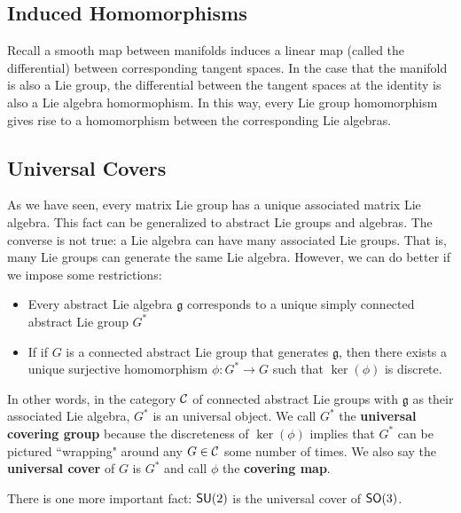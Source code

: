 \subsection{Induced Homomorphisms}
Recall a smooth map between manifolds induces a linear map (called the differential) between corresponding tangent spaces. In the case that the manifold is also a Lie group, the differential between the tangent spaces at the identity is also a Lie algebra homormophism. In this way, every Lie group homomorphism gives rise to a homomorphism between the corresponding Lie algebras.

\subsection{Universal Covers}
As we have seen, every matrix Lie group has a unique associated matrix Lie algebra. This fact can be generalized to abstract Lie groups and algebras. The converse is not true: a Lie algebra can have many associated Lie groups. That is, many Lie groups can generate the same Lie algebra. However, we can do better if we impose some restrictions:
\begin{itemize}
    \item Every abstract Lie algebra $\mathfrak g$ corresponds to a unique simply connected abstract Lie group $G^*$
    \item If if $G$ is a connected abstract Lie group that generates $\mathfrak g$, then there exists a unique surjective homomorphism $\phi: G^* \rightarrow G$ such that $\ker(\phi)$ is discrete.
\end{itemize}
In other words, in the category ${\mathcal C}$ of connected abstract Lie groups with $\mathfrak g$ as their associated Lie algebra, $G^*$ is an universal object. We call $G^*$ the \textbf{universal covering group} because the discreteness of $\ker(\phi)$ implies that $G^*$ can be pictured ``wrapping" around any $G \in {\mathcal C}$ some number of times. We also say the \textbf{universal cover} of $G$ is $G^*$ and call $\phi$ the \textbf{covering map}.

There is one more important fact: $\operatorname{\textsf{SU}}(2)$ is the universal cover of $\operatorname{\textsf{SO}}(3)$.
